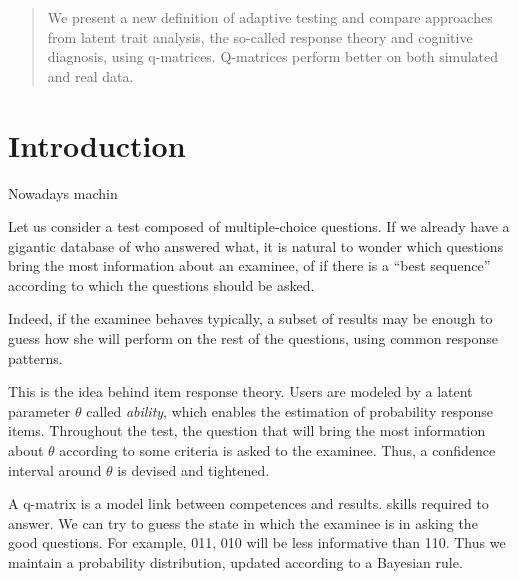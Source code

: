 \documentclass{sig-alternate}
\begin{document}
\maketitle
\begin{abstract}
We present a new definition of adaptive testing and compare approaches from latent trait analysis, the so-called response theory and cognitive diagnosis, using q-matrices. Q-matrices perform better on both simulated and real data.\end{abstract}




\section{Introduction}

Nowadays machin

Let us consider a test composed of multiple-choice questions. If we already have a gigantic database of who answered what, it is natural to wonder which questions bring the most information about an examinee, of if there is a ``best sequence'' according to which the questions should be asked. %

Indeed, if the examinee behaves typically, a subset of results may be enough to guess how she will perform on the rest of the questions, using common response patterns.

This is the idea behind item response theory. Users are modeled by a latent parameter $\theta$ called \emph{ability}, which enables the estimation of probability response items. %
Throughout the test, the question that will bring the most information about $\theta$ according to some criteria is asked to the examinee. Thus, a confidence interval around $\theta$ is devised and tightened. %

A q-matrix is a model link between competences and results. skills required to answer. We can try to guess the state in which the examinee is in asking the good questions. For example, 011, 010 will be less informative than 110. Thus we maintain a probability distribution, updated according to a Bayesian rule.
\end{document}
